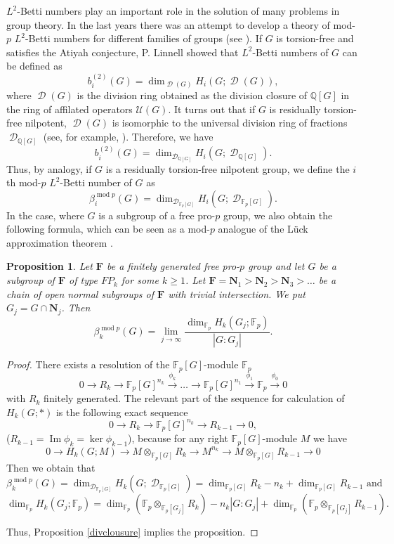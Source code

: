 \documentclass[11pt]{amsart}
\newtheorem{pro}[lem]{Proposition}
\numberwithin{claimcounter}{lem}
\DeclareMathOperator{\D}{\mathcal D}
\DeclareMathOperator{\im}{Im}
\newcommand{\F}{\mathbb{F}}
\newcommand{\Q}{\mathbb{Q}}
\begin{document}
$L^2$-Betti numbers play an important role in the solution of many problems in group theory. In the last years there was an attempt to develop a theory of mod-$p$ $L^2$-Betti numbers for different families of groups (see \cite{Jasurv19}). If $G$ is torsion-free and satisfies the Atiyah conjecture, P. Linnell \cite{Li93} showed that $L^2$-Betti numbers of $G$
 can be defined as $$b_i^{(2)}(G)= \dim_{\D(G) }H_i(G; \D(G)),$$ where $\D(G)$ is the division ring obtained as the division closure of $\Q[G]$ in the ring of affilated operators $\mathcal U(G)$. It turns out that if $G$ is residually torsion-free nilpotent, $\D(G)$ is isomorphic to the universal division ring of fractions $\D_{\Q[G]}$ (see, for example, \cite{JL19}). Therefore, we have 
$$b_i^{(2)}(G)= \dim_{\D_{\Q[G]} }H_i(G; \D_{\Q[G]}).$$
Thus, by analogy,  if  $G$ is  a residually torsion-free nilpotent group, we define the $i$th  mod-$p$ $L^2$-Betti number of $G$ as
$$\beta^{\operatorname{mod}p}_i(G)=\dim_{\D_{\F_p[G]}} H_i(G; \D_{\F_p[G]}).$$
In the case, where $G$ is a subgroup of a free pro-$p$ group, we also obtain the following formula, which can be seen as a   mod-$p$ analogue  of the L\"uck approximation theorem \cite{Lu94}.
\begin{pro} \label{beta1limit} Let $\mathbf F$ be a finitely generated free pro-$p$ group and let $G$ be a  subgroup of $\mathbf F$  of type $FP_k$ for some $k\ge 1$.  Let $\mathbf F=\mathbf N_1>\mathbf N_2>\mathbf N_3> \ldots$ be a chain of open normal subgroups of $\mathbf F$ with trivial intersection. We put $G_j=G\cap \mathbf  N_j$. Then 
$$\beta_k^{\operatorname{mod}p}(G)= \displaystyle \lim_{j\to \infty} \frac{\dim_{\F_p} H_k(G_j;\F_p)}{|G:G_j|}.$$
\end{pro}
\begin{proof}
There exists a resolution of the $\F_p[G]$-module $\F_p$ 
$$0\to R_k\to \F_p[G]^{n_{k}}\xrightarrow{\phi_k} \ldots \to \F_p[G]^{n_1}\xrightarrow{\phi_1}\F_p\xrightarrow{\phi_0} 0$$
with $R_k$ finitely generated.
The relevant  part of the sequence for calculation of $H_k(G;*)$ is the following exact sequence
$$ 0\to R_k\to \F_p[G]^{n_{k}}\to R_{k-1}\to 0,$$
($R_{k-1}=\im \phi_k=\ker \phi_{k-1}$), because for any right $\F_p[G]$-module $M$ we have
$$0\to H_k(G;M)\to M\otimes_{\F_p[G]} R_k\to  M^{n_{k}}\to M\otimes_{\F_p[G]} R_{k-1}\to 0  $$
Then we obtain that 
$$ \beta_k^{\operatorname{mod}p}(G)= \dim_{\D_{\F_p[G]}} H_k(G;\D_{\F_p[G]})=\dim_{\F_p[G]} R_k-{n_{k}}+\dim_{\F_p[G]} R_{k-1} \textrm{\ and\ }$$
$$ \dim_{\F_p} H_k(G_j;\F_p)=\dim_{\F_p}(\F_p\otimes_{\F_p[G_j]} R_k)-n_{k}|G:G_j|+ \dim_{\F_p}(\F_p\otimes_{\F_p[G_j]} R_{k-1}).$$
 
 Thus, Proposition \ref{divclousure} implies the proposition.\end{proof}
\end{document}
